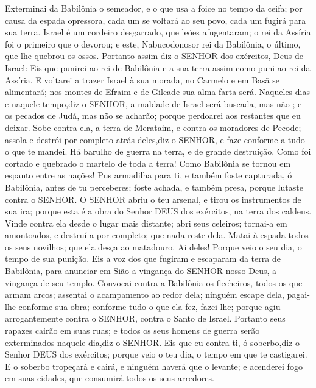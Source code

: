 {Exterminai da Babilônia o semeador, e o que usa a foice no tempo da ceifa; por causa da espada opressora, cada um se voltará ao seu povo, cada um fugirá para sua terra.
Israel é um cordeiro desgarrado, que leões afugentaram; o rei da Assíria foi o primeiro que o devorou; e este, Nabucodonosor rei da Babilônia, o último, que lhe quebrou os ossos.
Portanto assim diz o SENHOR dos exércitos, Deus de Israel: Eis que punirei ao rei de Babilônia e a sua terra assim como puni ao rei da Assíria.
E voltarei a trazer Israel à sua morada, no Carmelo e em Basã se alimentará; nos montes de Efraim e de Gileade sua alma farta será.
Naqueles dias e naquele tempo,diz o SENHOR, a maldade de Israel será buscada, mas não
{} ; e
{} os pecados de Judá, mas não se acharão; porque perdoarei aos restantes que eu deixar.
Sobe contra ela, a terra de Merataim, e contra os moradores de Pecode; assola e destrói por completo atrás deles,diz o SENHOR, e faze conforme a tudo o que te mandei.
Há barulho de guerra na terra, e de grande destruição.
Como foi cortado e quebrado o martelo de toda a terra! Como Babilônia se tornou em espanto entre as nações!
Pus armadilha para ti, e também foste capturada, ó Babilônia, antes de tu perceberes; foste achada, e também presa, porque lutaste contra o SENHOR.
O SENHOR abriu o teu arsenal, e tirou os instrumentos de sua ira; porque esta é a obra do Senhor DEUS dos exércitos, na terra dos caldeus.
Vinde contra ela desde o lugar mais distante; abri seus celeiros; tornai-a em amontoados, e destruí-a por completo; que nada reste dela.
Matai à espada todos os seus novilhos; que ela desça ao matadouro. Ai deles! Porque veio o seu dia, o tempo de sua punição.
Eis a voz dos que fugiram e escaparam da terra de Babilônia, para anunciar em Sião a vingança do SENHOR nosso Deus, a vingança de seu templo.
Convocai contra a Babilônia os flecheiros, todos os que armam arcos; assentai o acampamento ao redor dela; ninguém escape dela, pagai-lhe conforme sua obra; conforme tudo o que ela fez, fazei-lhe; porque agiu arrogantemente contra o SENHOR, contra o Santo de Israel.
Portanto seus rapazes cairão em suas ruas; e todos os seus homens de guerra serão exterminados naquele dia,diz o SENHOR.
Eis que eu contra ti, ó soberbo,diz o Senhor DEUS dos exércitos; porque veio o teu dia, o tempo em que te castigarei.
E o soberbo tropeçará e cairá, e ninguém haverá que o levante; e acenderei fogo em suas cidades, que consumirá todos os seus arredores.
}
